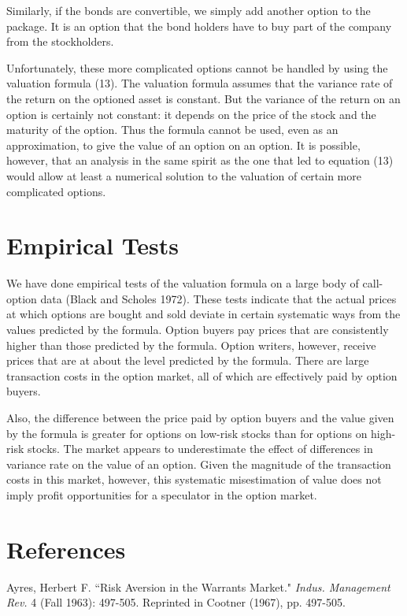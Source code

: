 \documentclass[a4paper, 12pt, twoside]{article}
\begin{document}
Similarly, if the bonds are convertible, we simply add another option to the package. 
It is an option that the bond holders have to buy part of the company from the 
stockholders.

Unfortunately, these more complicated options cannot be handled by using the valuation 
formula (13). The valuation formula assumes that the variance rate of the return on 
the optioned asset is constant. But the variance of the return on an option is 
certainly not constant: it depends on the price of the stock and the maturity of the 
option. Thus the formula cannot be used, even as an approximation, to give the value 
of an option on an option. It is possible, however, that an analysis in the same 
spirit as the one that led to equation (13) would allow at least a numerical solution 
to the valuation of certain more complicated options.

\section*{Empirical Tests}

We have done empirical tests of the valuation formula on a large body of call-option 
data (Black and Scholes 1972). These tests indicate that the actual prices at which 
options are bought and sold deviate in certain systematic ways from the values 
predicted by the formula. Option buyers pay prices that are consistently higher than 
those predicted by the formula. Option writers, however, receive prices that are at 
about the level predicted by the formula. There are large transaction costs in the 
option market, all of which are effectively paid by option buyers.

Also, the difference between the price paid by option buyers and the value given by 
the formula is greater for options on low-risk stocks than for options on high-risk 
stocks. The market appears to underestimate the effect of differences in variance rate 
on the value of an option. Given the magnitude of the transaction costs in this 
market, however, this systematic misestimation of value does not imply profit 
opportunities for a speculator in the option market.

\section*{References}

\begingroup
\linespread{1.15}\fontsize{10}{10}\selectfont

\hangindent 5mm
Ayres, Herbert F. ``Risk Aversion in the Warrants Market." \textit{Indus. Management Rev.} 4 
(Fall 1963): 497-505.  Reprinted in Cootner (1967), pp. 497-505.
\end{document}
